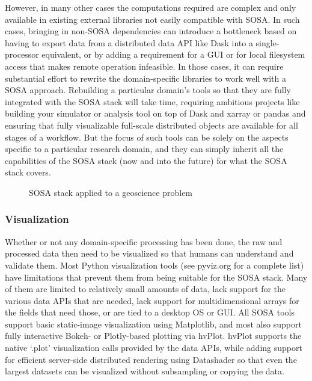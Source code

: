 However, in many other cases the computations required are complex and only available in existing external libraries not easily compatible with SOSA. In such cases, bringing in non-SOSA dependencies can introduce a bottleneck based on having to export data from a distributed data API like Dask into a single-processor equivalent, or by adding a requirement for a GUI or for local filesystem access that makes remote operation infeasible. In those cases, it can require substantial effort to rewrite the domain-specific libraries to work well with a SOSA approach. Rebuilding a particular domain's tools so that they are fully integrated with the SOSA stack will take time, requiring ambitious projects like building your simulator or analysis tool on top of Dask and xarray or pandas and ensuring that fully visualizable full-scale distributed objects are available for all stages of a workflow. But the focus of such tools can be solely on the aspects specific to a particular research domain, and they can simply inherit all the capabilities of the SOSA stack (now and into the future) for what the SOSA stack covers.

\begin{figure}[h]
    \noindent{}
    \caption{SOSA stack applied to a geoscience problem\label{sosa-geoscience}}
\end{figure}
\subsubsection{Visualization}

Whether or not any domain-specific processing has been done, the raw and processed data then need to be visualized so that humans can understand and validate them. Most Python visualization tools (see pyviz.org for a complete list) have limitations that prevent them from being suitable for the SOSA stack. Many of them are limited to relatively small amounts of data, lack support for the various data APIs that are needed, lack support for multidimensional arrays for the fields that need those, or are tied to a desktop OS or GUI. All SOSA tools support basic static-image visualization using Matplotlib, and most also support fully interactive Bokeh- or Plotly-based plotting via hvPlot. hvPlot supports the native `.plot' visualization calls provided by the data APIs, while adding support for efficient server-side distributed rendering using Datashader so that even the largest datasets can be visualized without subsampling or copying the data.

